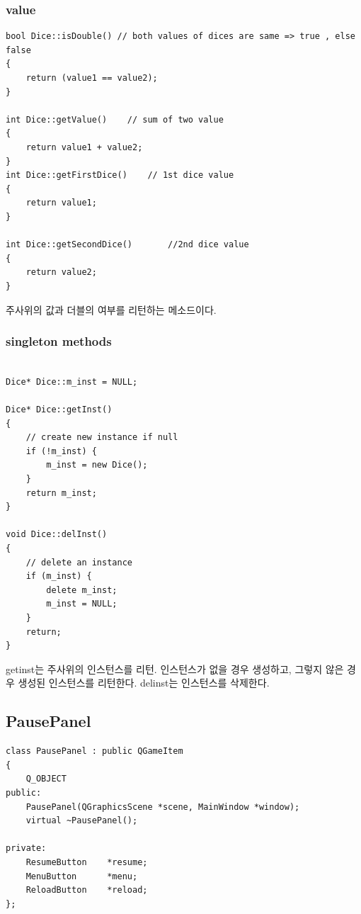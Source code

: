 \documentclass[10pt,oneside,a4paper,titlepage]{article}
\begin{document}
\subsubsection{value}

\begin{lstlisting}[caption={Dice values}]
bool Dice::isDouble() // both values of dices are same => true , else false
{
    return (value1 == value2);
}

int Dice::getValue()    // sum of two value
{
    return value1 + value2;
}
int Dice::getFirstDice()    // 1st dice value
{
    return value1;
}

int Dice::getSecondDice()       //2nd dice value
{
    return value2;
}
\end{lstlisting}

주사위의 값과 더블의 여부를 리턴하는 메소드이다. 


\subsubsection{singleton methods}

\begin{lstlisting}

Dice* Dice::m_inst = NULL;

Dice* Dice::getInst()
{
    // create new instance if null
    if (!m_inst) {
        m_inst = new Dice();
    }
    return m_inst;
}

void Dice::delInst()
{
    // delete an instance
    if (m_inst) {
        delete m_inst;
        m_inst = NULL;
    }
    return;
}

\end{lstlisting}

getinst는 주사위의 인스턴스를 리턴. 인스턴스가 없을 경우 생성하고, 그렇지 않은 경우 생성된 인스턴스를 리턴한다. delinst는 인스턴스를 삭제한다. 



\subsection{PausePanel}

\begin{lstlisting}[caption={PausePanel header}]
class PausePanel : public QGameItem
{
    Q_OBJECT
public:
    PausePanel(QGraphicsScene *scene, MainWindow *window);
    virtual ~PausePanel();

private:
    ResumeButton    *resume;
    MenuButton      *menu;
    ReloadButton    *reload;
};
\end{lstlisting}
\end{document}
